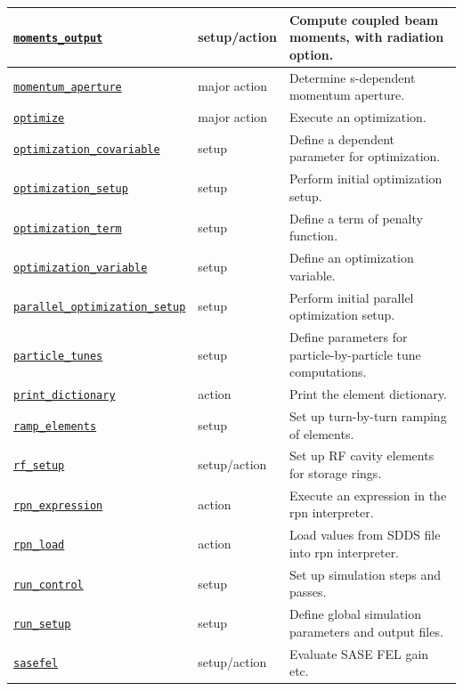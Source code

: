 \documentclass[11pt]{article}
\begin{document}
\begin{longtable}{|p{2.75in}|p{0.75in}|p{2.75in}|}
\hyperref[subsec:momentsoutput]{\tt moments\_output} & setup/action & Compute coupled beam moments, with radiation option. \\ \hline
\hyperref[subsec:momentumaperture]{\tt momentum\_aperture} & major action & Determine s-dependent momentum aperture. \\ \hline
\hyperref[subsec:optimize]{\tt optimize} & major action & Execute an optimization. \\ \hline
\hyperref[subsec:optimizationcovariable]{\tt optimization\_covariable} & setup & Define a dependent parameter for optimization. \\ \hline
\hyperref[subsec:optimizationsetup]{\tt optimization\_setup} & setup & Perform initial optimization setup. \\ \hline
\hyperref[subsec:optimizationterm]{\tt optimization\_term} & setup & Define a term of penalty function. \\ \hline
\hyperref[subsec:optimizationvariable]{\tt optimization\_variable} & setup & Define an optimization variable. \\ \hline
\hyperref[subsec:paralleloptimizationsetup]{\tt parallel\_optimization\_setup} & setup & Perform initial parallel optimization setup. \\ \hline
\hyperref[subsec:particletunes]{\tt particle\_tunes} & setup & Define parameters for particle-by-particle tune computations. \\ \hline
\hyperref[subsec:printdictionary]{\tt print\_dictionary} & action & Print the element dictionary. \\ \hline
\hyperref[subsec:rampelements]{\tt ramp\_elements} & setup & Set up turn-by-turn ramping of elements. \\ \hline
\hyperref[subsec:rfsetup]{\tt rf\_setup} & setup/action & Set up RF cavity elements for storage rings. \\ \hline
\hyperref[subsec:rpnexpression]{\tt rpn\_expression} & action & Execute an expression in the rpn interpreter. \\ \hline
\hyperref[subsec:rpnload]{\tt rpn\_load} & action & Load values from SDDS file into rpn interpreter. \\ \hline
\hyperref[subsec:runcontrol]{\tt run\_control} & setup & Set up simulation steps and passes. \\ \hline
\hyperref[subsec:runsetup]{\tt run\_setup} & setup & Define global simulation parameters and output files. \\ \hline
\hyperref[subsec:sasefel]{\tt sasefel} & setup/action & Evaluate SASE FEL gain etc. \\ \hline

\end{longtable}
\end{document}
